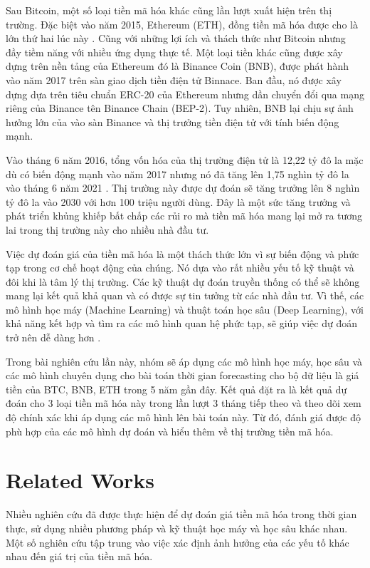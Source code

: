 \documentclass{ieeeojies}
\begin{document}
Sau Bitcoin, một số loại tiền mã hóa khác cũng lần lượt xuất hiện trên thị trường. Đặc biệt vào năm 2015, Ethereum (ETH), đồng tiền mã hóa được cho là lớn thứ hai lúc này \cite{b5}. Cũng với những lợi ích và thách thức như Bitcoin nhưng đầy tiềm năng với nhiều ứng dụng thực tế. Một loại tiền khác cũng được xây dựng trên nền tảng của Ethereum đó là Binance Coin (BNB), được phát hành vào năm 2017 trên sàn giao dịch tiền điện tử Binnace. Ban đầu, nó được xây dựng dựa trên tiêu chuẩn ERC-20 của Ethereum nhưng dần chuyển đổi qua mạng riêng của Binance tên Binance Chain (BEP-2). Tuy nhiên, BNB lại chịu sự ảnh hưởng lớn của vào sàn Binance và thị trưởng tiền điện tử với tính biến động mạnh.

Vào tháng 6 năm 2016, tổng vốn hóa của thị trường điện tử là 12,22 tỷ đô la mặc dù có biến động mạnh vào năm 2017 nhưng nó đã tăng lên 1,75 nghìn tỷ đô la vào tháng 6 năm 2021 \cite{b6}. Thị trường này được dự đoán sẽ tăng trưởng lên 8 nghìn tỷ đô la vào 2030 với hơn 100 triệu người dùng. Đây là một sức tăng trưởng và phát triển khủng khiếp bất chấp các rủi ro mà tiền mã hóa mang lại mở ra tương lai trong thị trường này cho nhiều nhà đầu tư.

Việc dự đoán giá của tiền mã hóa là một thách thức lớn vì sự biến động và phức tạp trong cơ chế hoạt động của chúng. Nó dựa vào rất nhiều yếu tố kỹ thuật và đôi khi là tâm lý thị trường. Các kỹ thuật dự đoán truyền thống có thể sẽ không mang lại kết quả khả quan và có được sự tin tưởng từ các nhà đầu tư. Vì thế, các mô hình học máy (Machine Learning) và thuật toán học sâu (Deep Learning), với khả năng kết hợp và tìm ra các mô hình quan hệ phức tạp, sẽ giúp việc dự đoán trở nên dễ dàng hơn \cite{b7}.

Trong bài nghiên cứu lần này, nhóm sẽ áp dụng các mô hình học máy, học sâu và các mô hình chuyên dụng cho bài toán thời gian forecasting cho bộ dữ liệu là giá tiền của BTC, BNB, ETH trong 5 năm gần đây. Kết quả đặt ra là kết quả dự đoán cho 3 loại tiền mã hóa này trong lần lượt 3 tháng tiếp theo và theo dõi xem độ chính xác khi áp dụng các mô hình lên bài toán này. Từ đó, đánh giá được độ phù hợp của các mô hình dự đoán và hiểu thêm về thị trường tiền mã hóa.

\section{Related Works}

Nhiều nghiên cứu đã được thực hiện để dự đoán giá tiền mã hóa trong thời gian thực, sử dụng nhiều phương pháp và kỹ thuật học máy và học sâu khác nhau. Một số nghiên cứu tập trung vào việc xác định ảnh hưởng của các yếu tố khác nhau đến giá trị của tiền mã hóa.
\end{document}

